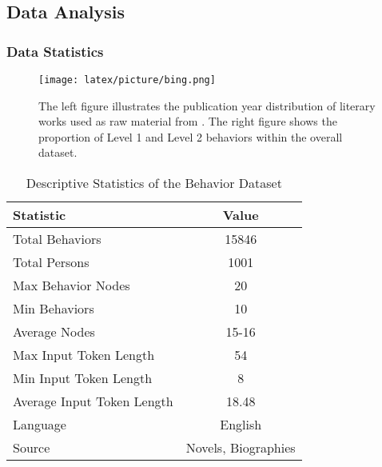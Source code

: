 \label{sec:app}



\subsection{Data Analysis}

\subsubsection{Data Statistics}

\begin{figure}[h]
    \centering
    \texttt{[image: latex/picture/bing.png]}
    \caption{The left figure illustrates the publication year distribution of literary works used as raw material from \datasetname. The right figure shows the proportion of Level 1 and Level 2 behaviors within the overall dataset.}
    \label{fig:bing}
\end{figure}






\begin{table}[h]
\centering
\begin{tabular}{lc}
\toprule
Statistic & Value \\
\midrule
Total Behaviors & 15846 \\
Total Persons & 1001 \\
Max Behavior Nodes & 20 \\
Min Behaviors & 10 \\
Average Nodes & 15-16 \\
Max Input Token Length & 54 \\
Min Input Token Length & 8 \\
Average Input Token Length & 18.48 \\
Language & English \\
Source & Novels, Biographies \\
\bottomrule
\end{tabular}
\caption{Descriptive Statistics of the Behavior Dataset}
\label{tab:behavior_stats} %
\end{table}

